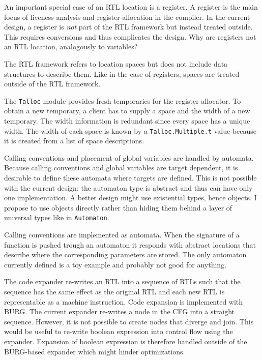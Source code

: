 \documentclass[11pt]{article}
\newcommand\CFG{{\small CFG}}
\newcommand\rtl{{\small RTL}}
\newcommand\burg{{\small BURG}}
\begin{document}
An important special case of an {\rtl} location is a register.  A
register is the main focus of liveness analysis and register allocation
in the compiler. In the current design, a register is \emph{not} part of
the {\rtl} framework but instead treated outside.  This requires
conversions and thus complicates the design.  Why are registers not an
{\rtl} location, analogously to variables?

The {\rtl} framework refers to location spaces but does not
include data structures to describe them. Like in the case of registers,
spaces are treated outside of the {\rtl} framework.   

The \texttt{Talloc} module provides fresh temporaries for the
register allocator. To obtain a new temporary, a client has to supply a
space and the width of a new temporary. The width information is
redundant since every space has a unique width. The width of each space
is known by a \texttt{Talloc.Multiple.t} value because it is created
from a list of space descriptions. 

Calling conventions and placement of global variables are handled
by automata. Because calling conventions and global variables are target
dependent, it is desirable to define these automata where targets are
defined. This is not possible with the current design: the automaton
type is abstract and thus can have only one implementation. A better
design might use existential types, hence objects. I propose to use
objects directly rather than hiding them behind a layer of universal
types like in \texttt{Automaton}.

Calling conventions are implemented as automata. When the
signature of a function is pushed trough an automaton it responds with
abstract locations that describe where the corresponding parameters are
stored. The only automaton currently defined is a toy example and
probably not good for anything.

The code expander re-writes an {\rtl} into a sequence of {\rtl}s
such that the sequence has the same effect as the original {\rtl} and
each new {\rtl} is representable as a machine instruction. Code
expansion is implemented with {\burg}. The current expander re-writes a
node in the {\CFG} into a straight sequence. However, it is not possible
to create nodes that diverge and join. This would be useful to re-write
boolean expression into control flow using the expander. Expansion of
boolean expression is therefore handled outside of the {\burg}-based
expander which might hinder optimizations. 
\end{document}
